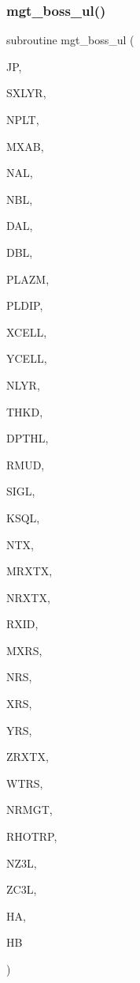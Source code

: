 \subsubsection{\texorpdfstring{mgt\+\_\+boss\+\_\+ul()}{mgt\_boss\_ul()}}
{\footnotesize\ttfamily subroutine mgt\+\_\+boss\+\_\+ul (\begin{DoxyParamCaption}\item[{integer}]{JP,  }\item[{integer}]{S\+X\+L\+YR,  }\item[{integer}]{N\+P\+LT,  }\item[{integer}]{M\+X\+AB,  }\item[{integer}]{N\+AL,  }\item[{integer}]{N\+BL,  }\item[{real}]{D\+AL,  }\item[{real}]{D\+BL,  }\item[{real, dimension (nplt)}]{P\+L\+A\+ZM,  }\item[{real, dimension (nplt)}]{P\+L\+D\+IP,  }\item[{real, dimension (mxab,nplt)}]{X\+C\+E\+LL,  }\item[{real, dimension (mxab,nplt)}]{Y\+C\+E\+LL,  }\item[{integer}]{N\+L\+YR,  }\item[{real(kind=ql), dimension(nlyr)}]{T\+H\+KD,  }\item[{real(kind=ql), dimension(nlyr)}]{D\+P\+T\+HL,  }\item[{real(kind=ql), dimension(0\+:nlyr)}]{R\+M\+UD,  }\item[{complex(kind=ql), dimension(nlyr)}]{S\+I\+GL,  }\item[{complex(kind=ql), dimension(nlyr)}]{K\+S\+QL,  }\item[{integer}]{N\+TX,  }\item[{integer}]{M\+R\+X\+TX,  }\item[{integer, dimension(ntx)}]{N\+R\+X\+TX,  }\item[{integer, dimension(mrxtx,ntx)}]{R\+X\+ID,  }\item[{integer}]{M\+X\+RS,  }\item[{integer, dimension(mrxtx,ntx)}]{N\+RS,  }\item[{real, dimension (mxrs,mrxtx,ntx)}]{X\+RS,  }\item[{real, dimension (mxrs,mrxtx,ntx)}]{Y\+RS,  }\item[{real, dimension (mrxtx,ntx)}]{Z\+R\+X\+TX,  }\item[{real, dimension (mxrs,mrxtx,ntx)}]{W\+T\+RS,  }\item[{integer}]{N\+R\+M\+GT,  }\item[{real, dimension(nrmgt)}]{R\+H\+O\+T\+RP,  }\item[{integer}]{N\+Z3L,  }\item[{real, dimension(nz3l)}]{Z\+C3L,  }\item[{complex, dimension (mxab,3,mrxtx,ntx,nplt)}]{HA,  }\item[{complex, dimension (mxab,3,mrxtx,ntx,nplt)}]{HB }\end{DoxyParamCaption})}

